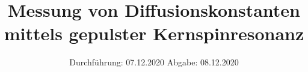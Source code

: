 

\subject{Nr. 49}
\title{Messung von Diffusionskonstanten mittels gepulster Kernspinresonanz}
\date{%
  Durchführung: 07.12.2020
  \hspace{3em}
  Abgabe: 08.12.2020
}



\maketitle
\thispagestyle{empty}
\tableofcontents
\newpage






\printbibliography{}



